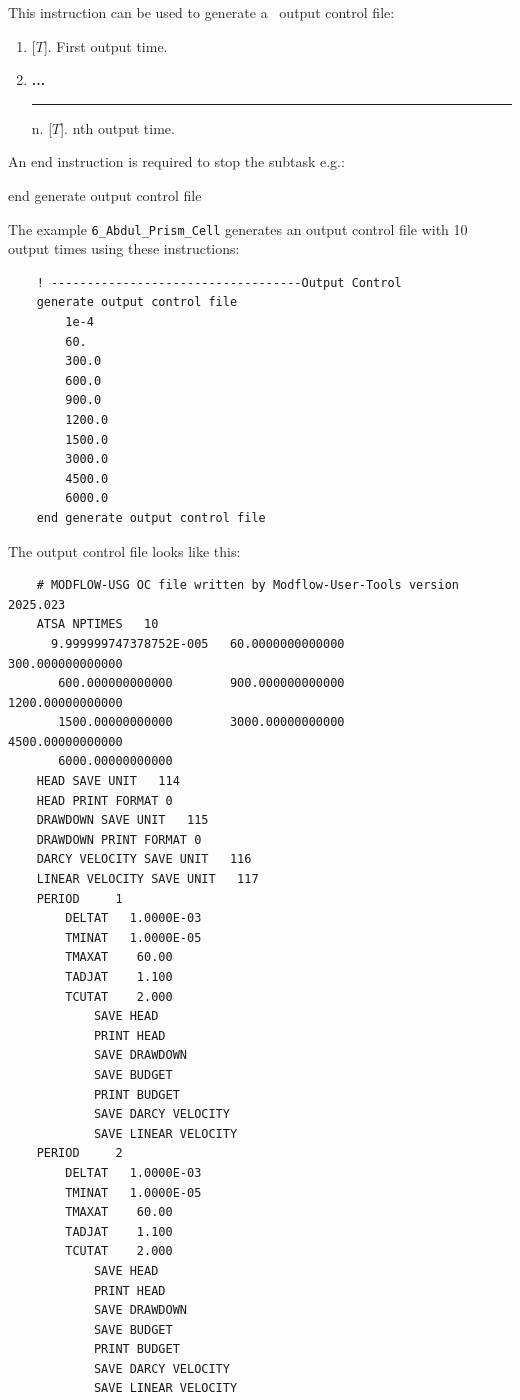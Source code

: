 \label{section:OutputControl}
This instruction can be used to generate a \mfus\ output control file:

    {
    \squish
    \begin{enumerate}
    \item {} [$T$].  First output time.
    \item \textbf{...} \\
     \hspace*{-.27in}\rule{0.in}{.24in}  n.  [$T$].  nth output time.
    \end{enumerate}

    An end instruction is required to stop the subtask e.g.:

    {\Large \sf end generate output control file}
    }

The  example \texttt{6\_Abdul\_Prism\_Cell} generates an output control file with 10 output times using these instructions:
\begin{verbatim}
    ! -----------------------------------Output Control
    generate output control file
        1e-4
        60.
        300.0
        600.0
        900.0
        1200.0
        1500.0
        3000.0
        4500.0
        6000.0
    end generate output control file
\end{verbatim}

The output control file looks like this:
\begin{verbatim}
    # MODFLOW-USG OC file written by Modflow-User-Tools version 2025.023
    ATSA NPTIMES   10
      9.999999747378752E-005   60.0000000000000        300.000000000000
       600.000000000000        900.000000000000        1200.00000000000
       1500.00000000000        3000.00000000000        4500.00000000000
       6000.00000000000
    HEAD SAVE UNIT   114
    HEAD PRINT FORMAT 0
    DRAWDOWN SAVE UNIT   115
    DRAWDOWN PRINT FORMAT 0
    DARCY VELOCITY SAVE UNIT   116
    LINEAR VELOCITY SAVE UNIT   117
    PERIOD     1
        DELTAT   1.0000E-03
        TMINAT   1.0000E-05
        TMAXAT    60.00
        TADJAT    1.100
        TCUTAT    2.000
            SAVE HEAD
            PRINT HEAD
            SAVE DRAWDOWN
            SAVE BUDGET
            PRINT BUDGET
            SAVE DARCY VELOCITY
            SAVE LINEAR VELOCITY
    PERIOD     2
        DELTAT   1.0000E-03
        TMINAT   1.0000E-05
        TMAXAT    60.00
        TADJAT    1.100
        TCUTAT    2.000
            SAVE HEAD
            PRINT HEAD
            SAVE DRAWDOWN
            SAVE BUDGET
            PRINT BUDGET
            SAVE DARCY VELOCITY
            SAVE LINEAR VELOCITY
\end{verbatim}

